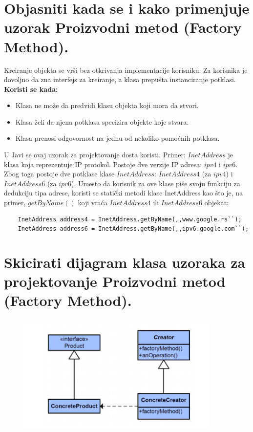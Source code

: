 \documentclass[a4paper]{article}
\begin{document}
\section{Objasniti kada se i kako primenjuje uzorak Proizvodni metod (Factory Method).}
  Kreiranje objekta se vrši bez otkrivanja implementacije korisniku. Za korisnika je dovoljno
  da zna interfejs za kreiranje, a klasa prepušta instanciranje potklasi. \\
  \textbf{Koristi se kada:}
  \begin{itemize}
    \item Klasa ne može da predvidi klasu objekta koji mora da stvori.
    \item Klasa želi da njena potklasa specizira objekte koje stvara.
    \item Klasa prenosi odgovornost na jednu od nekoliko pomoćnih potklasa.
  \end{itemize}
  \indent U Javi se ovaj uzorak za projektovanje dosta koristi. Primer: $InetAddress$ je klasa koja
  reprezentuje IP protokol. Postoje dve verzije IP adresa: $ipv4$ i $ipv6$. Zbog toga postoje
  dve potklase klase $InetAddress$: $InetAddress4$ (za $ipv4$) i $InetAddress6$ (za $ipv6$). Umesto
  da korisnik za ove klase piše svoju funkciju za dedukciju tipa adrese, koristi se 
  statički metodi klase InetAddress kao što je, na primer, $getByName()$ koji vraća $InetAddress4$
  ili $InetAddress6$ objekat:
  \begin{lstlisting}
    InetAddress address4 = InetAddress.getByName(,,www.google.rs``);
    InetAddress address6 = InetAddress.getByName(,,ipv6.google.com``);\end{lstlisting}

\section{Skicirati dijagram klasa uzoraka za projektovanje Proizvodni metod (Factory Method).}
  \begin{figure}[H]
    \begin{center}
        \includegraphics[width=100mm,height=60mm]{Slike/dp_factory_method.png}
    \end{center}
  \end{figure} 
\end{document}
